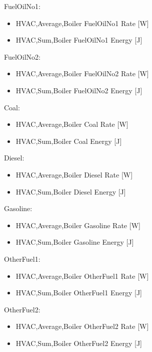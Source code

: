 FuelOilNo1:

\begin{itemize}
\item
  HVAC,Average,Boiler FuelOilNo1 Rate {[}W{]}
\item
  HVAC,Sum,Boiler FuelOilNo1 Energy {[}J{]}
\end{itemize}

FuelOilNo2:

\begin{itemize}
\item
  HVAC,Average,Boiler FuelOilNo2 Rate {[}W{]}
\item
  HVAC,Sum,Boiler FuelOilNo2 Energy {[}J{]}
\end{itemize}

Coal:

\begin{itemize}
\item
  HVAC,Average,Boiler Coal Rate {[}W{]}
\item
  HVAC,Sum,Boiler Coal Energy {[}J{]}
\end{itemize}

Diesel:

\begin{itemize}
\item
  HVAC,Average,Boiler Diesel Rate {[}W{]}
\item
  HVAC,Sum,Boiler Diesel Energy {[}J{]}
\end{itemize}

Gasoline:

\begin{itemize}
\item
  HVAC,Average,Boiler Gasoline Rate {[}W{]}
\item
  HVAC,Sum,Boiler Gasoline Energy {[}J{]}
\end{itemize}

OtherFuel1:

\begin{itemize}
\item
  HVAC,Average,Boiler OtherFuel1 Rate {[}W{]}
\item
  HVAC,Sum,Boiler OtherFuel1 Energy {[}J{]}
\end{itemize}

OtherFuel2:

\begin{itemize}
\item
  HVAC,Average,Boiler OtherFuel2 Rate {[}W{]}
\item
  HVAC,Sum,Boiler OtherFuel2 Energy {[}J{]}
\end{itemize}

